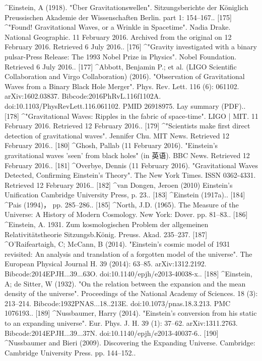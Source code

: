 ^Einstein, A (1918). "Über Gravitationswellen". Sitzungsberichte der Königlich Preussischen Akademie der Wissenschaften Berlin. part 1: 154–167..
[175]
^"Found! Gravitational Waves, or a Wrinkle in Spacetime". Nadia Drake. National Geographic. 11 February 2016. Archived from the original on 12 February 2016. Retrieved 6 July 2016..
[176]
^"Gravity investigated with a binary pulsar-Press Release: The 1993 Nobel Prize in Physics". Nobel Foundation. Retrieved 6 July 2016..
[177]
^Abbott, Benjamin P.; et al. (LIGO Scientific Collaboration and Virgo Collaboration) (2016). "Observation of Gravitational Waves from a Binary Black Hole Merger". Phys. Rev. Lett. 116 (6): 061102. arXiv:1602.03837. Bibcode:2016PhRvL.116f1102A. doi:10.1103/PhysRevLett.116.061102. PMID 26918975. Lay summary (PDF)..
[178]
^"Gravitational Waves: Ripples in the fabric of space-time". LIGO | MIT. 11 February 2016. Retrieved 12 February 2016..
[179]
^"Scientists make first direct detection of gravitational waves". Jennifer Chu. MIT News. Retrieved 12 February 2016..
[180]
^Ghosh, Pallab (11 February 2016). "Einstein's gravitational waves 'seen' from black holes" (in 英语). BBC News. Retrieved 12 February 2016..
[181]
^Overbye, Dennis (11 February 2016). "Gravitational Waves Detected, Confirming Einstein's Theory". The New York Times. ISSN 0362-4331. Retrieved 12 February 2016..
[182]
^van Dongen, Jeroen (2010) Einstein's Unification Cambridge University Press, p. 23..
[183]
^Einstein (1917a)..
[184]
^Pais (1994)， pp. 285–286..
[185]
^North, J.D. (1965). The Measure of the Universe: A History of Modern Cosmology. New York: Dover. pp. 81–83..
[186]
^Einstein, A. 1931. Zum kosmologischen Problem der allgemeinen Relativitätstheorie Sitzungsb.König. Preuss. Akad. 235–237.
[187]
^O'Raifeartaigh, C; McCann, B (2014). "Einstein's cosmic model of 1931 revisited: An analysis and translation of a forgotten model of the universe". The European Physical Journal H. 39 (2014): 63–85. arXiv:1312.2192. Bibcode:2014EPJH...39...63O. doi:10.1140/epjh/e2013-40038-x..
[188]
^Einstein, A; de Sitter, W (1932). "On the relation between the expansion and the mean density of the universe". Proceedings of the National Academy of Sciences. 18 (3): 213–214. Bibcode:1932PNAS...18..213E. doi:10.1073/pnas.18.3.213. PMC 1076193..
[189]
^Nussbaumer, Harry (2014). "Einstein's conversion from his static to an expanding universe". Eur. Phys. J. H. 39 (1): 37–62. arXiv:1311.2763. Bibcode:2014EPJH...39...37N. doi:10.1140/epjh/e2013-40037-6..
[190]
^Nussbaumer and Bieri (2009). Discovering the Expanding Universe. Cambridge: Cambridge University Press. pp. 144–152..
